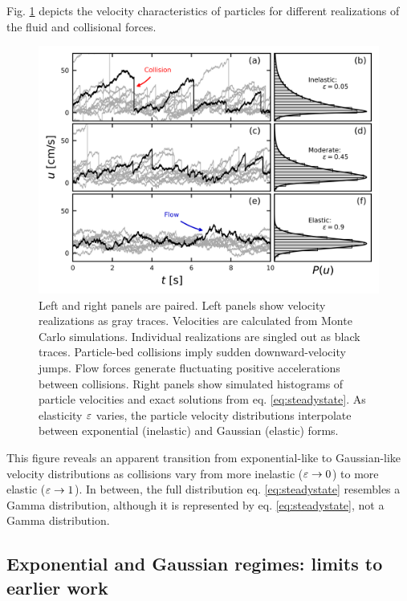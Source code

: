 Fig. \ref{fig:fig2} depicts the velocity characteristics of particles for different realizations of the fluid and collisional forces.
\begin{figure}
	\centerline{\includegraphics{./figures/ch5/Fig2pdfs.png}}
	\caption{Left and right panels are paired. Left panels show velocity realizations as gray traces. Velocities are calculated from Monte Carlo simulations. Individual realizations are singled out as black traces. Particle-bed collisions imply sudden downward-velocity jumps. Flow forces generate fluctuating positive accelerations between collisions. Right panels show simulated histograms of particle velocities and exact solutions from eq. \ref{eq:steadystate}. As elasticity $\varepsilon$ varies, the particle velocity distributions interpolate between exponential (inelastic) and Gaussian (elastic) forms.}
	\label{fig:fig2}
\end{figure}
This figure reveals an apparent transition from exponential-like to Gaussian-like velocity distributions as collisions vary from more inelastic ($\varepsilon \rightarrow 0$) to more elastic ($\varepsilon \rightarrow 1$). In between, the full distribution eq. \ref{eq:steadystate} resembles a Gamma distribution, although it is represented by eq. \ref{eq:steadystate}, not a Gamma distribution.


\subsection{Exponential and Gaussian regimes: limits to earlier work}
\label{sec:langmodelcomparison}

